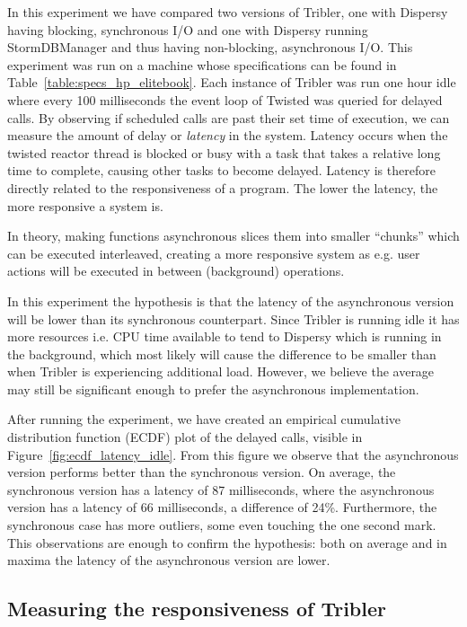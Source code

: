 In this experiment we have compared two versions of Tribler, one with Dispersy having blocking, synchronous I/O and one with Dispersy running StormDBManager and thus having non-blocking, asynchronous I/O.
This experiment was run on a machine whose specifications can be found in Table~\ref{table:specs_hp_elitebook}.
Each instance of Tribler was run one hour idle where every 100 milliseconds the event loop of Twisted was queried for delayed calls.
By observing if scheduled calls are past their set time of execution, we can measure the amount of delay or \emph{latency} in the system.
Latency occurs when the twisted reactor thread is blocked or busy with a task that takes a relative long time to complete, causing other tasks to become delayed.
Latency is therefore directly related to the responsiveness of a program.
The lower the latency, the more responsive a system is.

In theory, making functions asynchronous slices them into smaller \enquote{chunks} which can be executed interleaved, creating a more responsive system as e.g. user actions will be executed in between (background) operations.

In this experiment the hypothesis is that the latency of the asynchronous version will be lower than its synchronous counterpart.
Since Tribler is running idle it has more resources i.e. CPU time available to tend to Dispersy which is running in the background, which most likely will cause the difference to be smaller than when Tribler is experiencing additional load.
However, we believe the average may still be significant enough to prefer the asynchronous implementation.

After running the experiment, we have created an empirical cumulative distribution function (ECDF) plot of the delayed calls, visible in Figure~\ref{fig:ecdf_latency_idle}.
From this figure we observe that the asynchronous version performs better than the synchronous version.
On average, the synchronous version has a latency of 87 milliseconds, where the asynchronous version has a latency of 66 milliseconds, a difference of 24\%.
Furthermore, the synchronous case has more outliers, some even touching the one second mark.
This observations are enough to confirm the hypothesis: both on average and in maxima the latency of the asynchronous version are lower.

\subsection{Measuring the responsiveness of Tribler}

